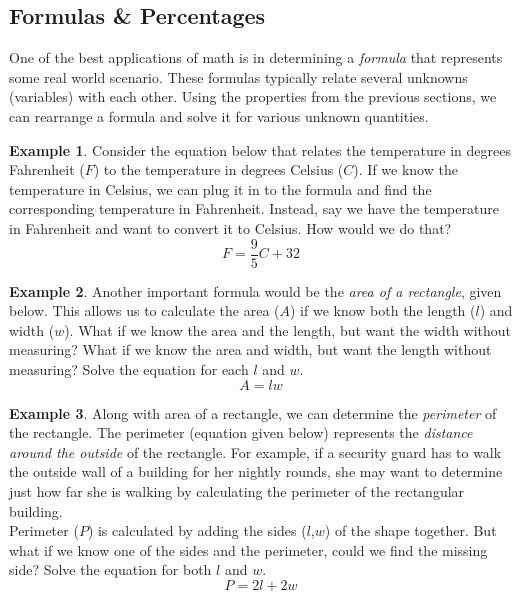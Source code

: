 \documentclass[addpoints,12pt]{exam}
\theoremstyle{definition}
\theoremstyle{break}
\theoremstyle{break}
\newtheorem{example}{Example}[subsection]
\begin{document}
\setcounter{section}{2}
\setcounter{subsection}{3}

\subsection{Formulas \& Percentages}

\vspace{.25in}

\noindent One of the best applications of math is in determining a \emph{formula} that represents some real world scenario. These formulas typically relate several unknowns (variables) with each other. Using the properties from the previous sections, we can rearrange a formula and solve it for various unknown quantities.

\vspace{.15in}

\begin{example}
Consider the equation below that relates the temperature in degrees Fahrenheit ($F$) to the temperature in degrees Celsius ($C$). If we know the temperature in Celsius, we can plug it in to the formula and find the corresponding temperature in Fahrenheit. Instead, say we have the temperature in Fahrenheit and want to convert it to Celsius. How would we do that?
\[ F = \dfrac{9}{5}C + 32\]

\end{example}

\newpage

\begin{example}
Another important formula would be the \emph{area of a rectangle}, given below. This allows us to calculate the area ($A$) if we know both the length ($l$) and width ($w$). What if we know the area and the length, but want the width without measuring? What if we know the area and width, but want the length without measuring? Solve the equation for each $l$ and $w$.
\[A = lw\]
\vspace{1in}
\end{example}

\begin{example}
Along with area of a rectangle, we can determine the \emph{perimeter} of the rectangle. The perimeter (equation given below) represents the \emph{distance around the outside} of the rectangle. For example, if a security guard has to walk the outside wall of a building for her nightly rounds, she may want to determine just how far she is walking by calculating the perimeter of the rectangular building.
\\

\noindent Perimeter ($P$) is calculated by adding the sides ($l$,$w$) of the shape together. But what if we know one of the sides and the perimeter, could we find the missing side? Solve the equation for both $l$ and $w$.
\[P = 2l+2w\]
\end{example}
\end{document}
